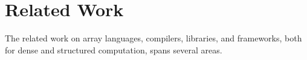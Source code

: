 \section{Related Work}

The related work on array languages, compilers, libraries, and frameworks, both for dense and structured computation, spans several areas.




